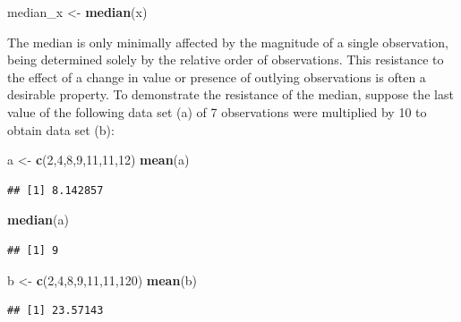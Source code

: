\documentclass[]{book}
\newenvironment{Shaded}{\begin{snugshade}}{\end{snugshade}}
\newcommand{\DecValTok}[1]{\textcolor[rgb]{0.00,0.00,0.81}{#1}}
\newcommand{\KeywordTok}[1]{\textcolor[rgb]{0.13,0.29,0.53}{\textbf{#1}}}
\newcommand{\NormalTok}[1]{#1}
\newcommand{\StringTok}[1]{\textcolor[rgb]{0.31,0.60,0.02}{#1}}
\begin{document}
\begin{Shaded}
\begin{Highlighting}[]
\NormalTok{median_x <-}\StringTok{ }\KeywordTok{median}\NormalTok{(x)}
\end{Highlighting}
\end{Shaded}

The median is only minimally affected by the magnitude of a single observation, being determined solely by the relative order of observations. This resistance to the effect of a change in value or presence of outlying observations is often a desirable property. To demonstrate the resistance of the median, suppose the last value of the following data set (a) of 7 observations were multiplied by 10 to obtain data set (b):

\begin{Shaded}
\begin{Highlighting}[]
\NormalTok{a <-}\StringTok{ }\KeywordTok{c}\NormalTok{(}\DecValTok{2}\NormalTok{,}\DecValTok{4}\NormalTok{,}\DecValTok{8}\NormalTok{,}\DecValTok{9}\NormalTok{,}\DecValTok{11}\NormalTok{,}\DecValTok{11}\NormalTok{,}\DecValTok{12}\NormalTok{)}
\KeywordTok{mean}\NormalTok{(a)}
\end{Highlighting}
\end{Shaded}

\begin{verbatim}
## [1] 8.142857
\end{verbatim}

\begin{Shaded}
\begin{Highlighting}[]
\KeywordTok{median}\NormalTok{(a)}
\end{Highlighting}
\end{Shaded}

\begin{verbatim}
## [1] 9
\end{verbatim}

\begin{Shaded}
\begin{Highlighting}[]
\NormalTok{b <-}\StringTok{ }\KeywordTok{c}\NormalTok{(}\DecValTok{2}\NormalTok{,}\DecValTok{4}\NormalTok{,}\DecValTok{8}\NormalTok{,}\DecValTok{9}\NormalTok{,}\DecValTok{11}\NormalTok{,}\DecValTok{11}\NormalTok{,}\DecValTok{120}\NormalTok{)}
\KeywordTok{mean}\NormalTok{(b)}
\end{Highlighting}
\end{Shaded}

\begin{verbatim}
## [1] 23.57143
\end{verbatim}
\end{document}
